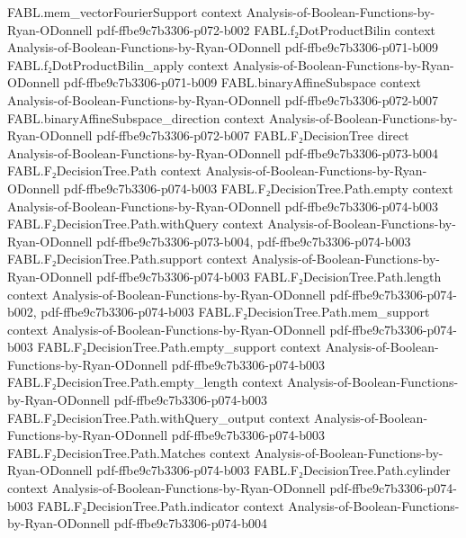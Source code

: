 \begin{theorem}
  {FABL.mem_vectorFourierSupport}
  {context}
  {Analysis-of-Boolean-Functions-by-Ryan-ODonnell}
  {pdf-ffbe9c7b3306-p072-b002}
\proofstep
  {FABL.f₂DotProductBilin}
  {context}
  {Analysis-of-Boolean-Functions-by-Ryan-ODonnell}
  {pdf-ffbe9c7b3306-p071-b009}
\proofstep
  {FABL.f₂DotProductBilin_apply}
  {context}
  {Analysis-of-Boolean-Functions-by-Ryan-ODonnell}
  {pdf-ffbe9c7b3306-p071-b009}
\proofstep
  {FABL.binaryAffineSubspace}
  {context}
  {Analysis-of-Boolean-Functions-by-Ryan-ODonnell}
  {pdf-ffbe9c7b3306-p072-b007}
\proofstep
  {FABL.binaryAffineSubspace_direction}
  {context}
  {Analysis-of-Boolean-Functions-by-Ryan-ODonnell}
  {pdf-ffbe9c7b3306-p072-b007}
\proofstep
  {FABL.F₂DecisionTree}
  {direct}
  {Analysis-of-Boolean-Functions-by-Ryan-ODonnell}
  {pdf-ffbe9c7b3306-p073-b004}
\proofstep
  {FABL.F₂DecisionTree.Path}
  {context}
  {Analysis-of-Boolean-Functions-by-Ryan-ODonnell}
  {pdf-ffbe9c7b3306-p074-b003}
\proofstep
  {FABL.F₂DecisionTree.Path.empty}
  {context}
  {Analysis-of-Boolean-Functions-by-Ryan-ODonnell}
  {pdf-ffbe9c7b3306-p074-b003}
\proofstep
  {FABL.F₂DecisionTree.Path.withQuery}
  {context}
  {Analysis-of-Boolean-Functions-by-Ryan-ODonnell}
  {pdf-ffbe9c7b3306-p073-b004,
    pdf-ffbe9c7b3306-p074-b003}
\proofstep
  {FABL.F₂DecisionTree.Path.support}
  {context}
  {Analysis-of-Boolean-Functions-by-Ryan-ODonnell}
  {pdf-ffbe9c7b3306-p074-b003}
\proofstep
  {FABL.F₂DecisionTree.Path.length}
  {context}
  {Analysis-of-Boolean-Functions-by-Ryan-ODonnell}
  {pdf-ffbe9c7b3306-p074-b002,
    pdf-ffbe9c7b3306-p074-b003}
\proofstep
  {FABL.F₂DecisionTree.Path.mem_support}
  {context}
  {Analysis-of-Boolean-Functions-by-Ryan-ODonnell}
  {pdf-ffbe9c7b3306-p074-b003}
\proofstep
  {FABL.F₂DecisionTree.Path.empty_support}
  {context}
  {Analysis-of-Boolean-Functions-by-Ryan-ODonnell}
  {pdf-ffbe9c7b3306-p074-b003}
\proofstep
  {FABL.F₂DecisionTree.Path.empty_length}
  {context}
  {Analysis-of-Boolean-Functions-by-Ryan-ODonnell}
  {pdf-ffbe9c7b3306-p074-b003}
\proofstep
  {FABL.F₂DecisionTree.Path.withQuery_output}
  {context}
  {Analysis-of-Boolean-Functions-by-Ryan-ODonnell}
  {pdf-ffbe9c7b3306-p074-b003}
\proofstep
  {FABL.F₂DecisionTree.Path.Matches}
  {context}
  {Analysis-of-Boolean-Functions-by-Ryan-ODonnell}
  {pdf-ffbe9c7b3306-p074-b003}
\proofstep
  {FABL.F₂DecisionTree.Path.cylinder}
  {context}
  {Analysis-of-Boolean-Functions-by-Ryan-ODonnell}
  {pdf-ffbe9c7b3306-p074-b003}
\proofstep
  {FABL.F₂DecisionTree.Path.indicator}
  {context}
  {Analysis-of-Boolean-Functions-by-Ryan-ODonnell}
  {pdf-ffbe9c7b3306-p074-b004}
\proofstep

\end{theorem}
